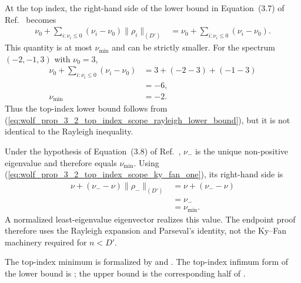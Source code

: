 \documentclass{article}
\begin{document}
At the top index, the right-hand side of the lower bound in Equation~(3.7) of
Ref.~\cite{Wolf2012Quantum} becomes
\begin{align}
    \nu_0+
    \sum_{i:\nu_i\leq0}
        (\nu_i-\nu_0)\lVert\rho_i\rVert_{(D')}
        &=
    \nu_0+\sum_{i:\nu_i\leq0}(\nu_i-\nu_0).
    \label{eq:wolf_prop_3_2_top_index_scope_lower_endpoint_value}
\end{align}
This quantity is at most $\nu_{\min}$ and can be strictly smaller. For the
spectrum $(-2,-1,3)$ with $\nu_0=3$,
\begin{align}
    \nu_0+\sum_{i:\nu_i\leq0}(\nu_i-\nu_0)
        &=3+(-2-3)+(-1-3)
    \label{eq:wolf_prop_3_2_top_index_scope_example_calculation}\\
        &=-6,
    \label{eq:wolf_prop_3_2_top_index_scope_example_value}\\
    \nu_{\min}&=-2.
    \label{eq:wolf_prop_3_2_top_index_scope_example_minimum}
\end{align}
Thus the top-index lower bound follows from
(\ref{eq:wolf_prop_3_2_top_index_scope_rayleigh_lower_bound}), but it is not
identical to the Rayleigh inequality.

Under the hypothesis of Equation~(3.8) of Ref.~\cite{Wolf2012Quantum},
$\nu_-$ is the unique non-positive eigenvalue and therefore equals
$\nu_{\min}$. Using
(\ref{eq:wolf_prop_3_2_top_index_scope_ky_fan_one}), its right-hand side is
\begin{align}
    \nu+(\nu_--\nu)\lVert\rho_-\rVert_{(D')}
        &=\nu+(\nu_--\nu)
    \label{eq:wolf_prop_3_2_top_index_scope_upper_endpoint_first}\\
        &=\nu_-
    \label{eq:wolf_prop_3_2_top_index_scope_upper_endpoint_value}\\
        &=\nu_{\min}.
    \label{eq:wolf_prop_3_2_top_index_scope_upper_endpoint_minimum}
\end{align}
A normalized least-eigenvalue eigenvector realizes this value. The endpoint
proof therefore uses the Rayleigh expansion and Parseval's identity, not the
Ky--Fan machinery required for $n<D'$.

The top-index minimum is formalized by
 and
. The top-index
infimum form of the lower bound is
; the upper
bound is the corresponding half of
.
\end{document}
